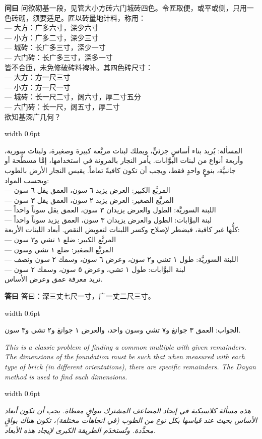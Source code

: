 \documentclass[11pt,a4paper]{article}
\newlength{\cnwidth}
\newlength{\arwidth}
\newcommand{\paralleltext}[2]{%
  \par\medskip\noindent
  \begin{minipage}[t]{\cnwidth}%
    \small #1%
  \end{minipage}%
  \hfill\textcolor{colrule}{\vrule width 0.6pt}\hfill
  \begin{minipage}[t]{\arwidth}%
    \small\arabicfont\beginR #2\endR%
  \end{minipage}%
  \par\medskip
}
\newcommand{\cnlabel}[1]{\textbf{\color{notecolor}#1}}
\newcommand{\arlabel}[1]{\arabicfontbf\color{notecolor}\beginR #1\endR}
\begin{document}
\paralleltext{%
\cnlabel{问曰} 问欲砌基一段，见管大小方砖六门城砖四色。令匠取便，或平或侧，只用一色砖砌，须要适足。匠以砖量地计料，称用：\\
--- 大方：广多六寸，深少六寸\\
--- 小方：广多二寸，深少三寸\\
--- 城砖：长广多三寸，深少一寸\\
--- 六门砖：长广多三寸，深多一寸\\
皆不合匝，未免修破砖料裨补。其四色砖尺寸：\\
--- 大方：方一尺三寸\\
--- 小方：方一尺一寸\\
--- 城砖：长一尺二寸，阔六寸，厚二寸五分\\
--- 六门砖：长一尺，阔五寸，厚二寸\\
欲知基深广几何？%
}{%
\arlabel{المسألة:} يُريد بناء أساسٍ جزئيٍّ، ويملك لبنات مربَّعة كبيرة وصغيرة، ولبنات سورية، وأربعة أنواع من لبنات البوَّابات. يأمر النجار بالمرونة في استخدامها، إمَّا مسطَّحة أو جانبيَّة، بنوعٍ واحدٍ فقط، ويجب أن تكون كافيةً تماماً. يقيس النجار الأرض بالطوب ويحسب المواد:\\
--- المربَّع الكبير: العرض يزيد ٦ سون، العمق يقل ٦ سون\\
--- المربَّع الصغير: العرض يزيد ٢ سون، العمق يقل ٣ سون\\
--- اللبنة السوريَّة: الطول والعرض يزيدان ٣ سون، العمق يقل سوناً واحداً\\
--- لبنة البوَّابات: الطول والعرض يزيدان ٣ سون، العمق يزيد سوناً واحداً\\
كلُّها غير كافية، فيضطر لإصلاح وكسر اللبنات لتعويض النقص. أبعاد اللبنات الأربعة:\\
--- المربَّع الكبير: ضلع ١ تشي و٣ سون\\
--- المربَّع الصغير: ضلع ١ تشي وسون\\
--- اللبنة السوريَّة: طول ١ تشي و٢ سون، وعرض ٦ سون، وسمك ٢ سون ونصف\\
--- لبنة البوَّابات: طول ١ تشي، وعرض ٥ سون، وسمك ٢ سون\\
نريد معرفة عمق وعرض الأساس.
}

\paralleltext{%
\cnlabel{答曰} 答曰：深三丈七尺一寸，广一丈二尺三寸。%
}{%
\arlabel{الجواب:} العمق ٣ جوانغ و٧ تشي وسون واحد، والعرض ١ جوانغ و٢ تشي و٣ سون.
}

\paralleltext{%
\textit{This is a classic problem of finding a common multiple with given remainders. The dimensions of the foundation must be such that when measured with each type of brick (in different orientations), there are specific remainders. The Dayan method is used to find such dimensions.}%
}{%
\textit{هذه مسألة كلاسيكية في إيجاد المضاعف المشترك ببواقٍ معطاة. يجب أن تكون أبعاد الأساس بحيث عند قياسها بكل نوع من الطوب (في اتجاهات مختلفة)، تكون هناك بواقٍ محدَّدة. وتُستخدَم الطريقة الكبرى لإيجاد هذه الأبعاد.}
}
\end{document}
